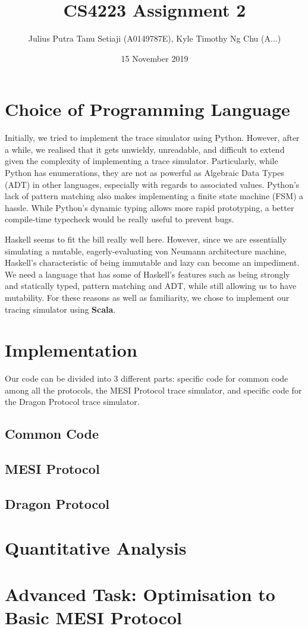\documentclass[a4paper,12pt]{article}
\title{CS4223 Assignment 2}
\author{Julius Putra Tanu Setiaji (A0149787E), Kyle Timothy Ng Chu (A...)}
\date{15 November 2019}
\begin{document}
\maketitle

\section{Choice of Programming Language}
Initially, we tried to implement the trace simulator using Python.
However, after a while, we realised that it gets unwieldy, unreadable, and difficult to extend given the complexity of implementing a trace simulator.
Particularly, while Python has enumerations, they are not as powerful as Algebraic Data Types (ADT) in other languages, especially with regards to associated values.
Python's lack of pattern matching also makes implementing a finite state machine (FSM) a hassle.
While Python's dynamic typing allows more rapid prototyping, a better compile-time typecheck would be really useful to prevent bugs.

Haskell seems to fit the bill really well here.
However, since we are essentially simulating a mutable, eagerly-evaluating von Neumann architecture machine, Haskell's characteristic of being immutable and lazy can become an impediment.
We need a language that has some of Haskell's features such as being strongly and statically typed, pattern matching and ADT, while still allowing us to have mutability.
For these reasons as well as familiarity, we chose to implement our tracing simulator using \textbf{Scala}.

\section{Implementation}
Our code can be divided into 3 different parts: specific code for common code among all the protocols, the MESI Protocol trace simulator, and specific code for the Dragon Protocol trace simulator.

\subsection{Common Code}

\subsection{MESI Protocol}

\subsection{Dragon Protocol}

\section{Quantitative Analysis}

\section{Advanced Task: Optimisation to Basic MESI Protocol}
\end{document}
